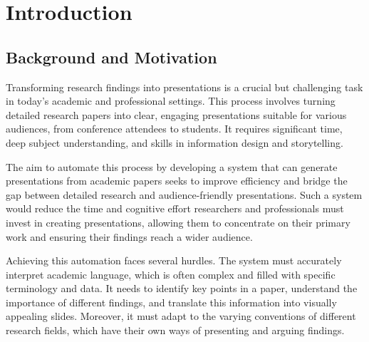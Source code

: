 
\chapter{Introduction}
\label{ch:intro}


\section{Background and Motivation}
\label{sec:intro:background}


Transforming research findings into presentations is a crucial but challenging task in today's academic and professional settings. This process involves turning detailed research papers into clear, engaging presentations suitable for various audiences, from conference attendees to students. It requires significant time, deep subject understanding, and skills in information design and storytelling.

The aim to automate this process by developing a system that can generate presentations from academic papers seeks to improve efficiency and bridge the gap between detailed research and audience-friendly presentations. Such a system would reduce the time and cognitive effort researchers and professionals must invest in creating presentations, allowing them to concentrate on their primary work and ensuring their findings reach a wider audience.

Achieving this automation faces several hurdles. The system must accurately interpret academic language, which is often complex and filled with specific terminology and data. It needs to identify key points in a paper, understand the importance of different findings, and translate this information into visually appealing slides. Moreover, it must adapt to the varying conventions of different research fields, which have their own ways of presenting and arguing findings.

